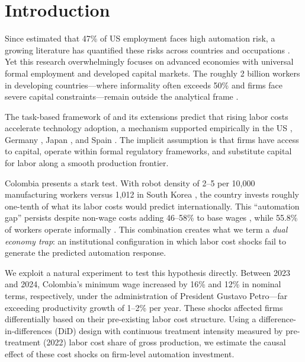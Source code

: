 \documentclass[5p,times,authoryear]{elsarticle}
\begin{document}

\section{Introduction}
\label{sec:introduction}

Since \citet{frey2017future} estimated that 47\% of US employment faces high automation risk, a growing literature has quantified these risks across countries and occupations \citep{arntz2016, webb2020, eloundou2023gpts}. Yet this research overwhelmingly focuses on advanced economies with universal formal employment and developed capital markets. The roughly 2 billion workers in developing countries---where informality often exceeds 50\% and firms face severe capital constraints---remain outside the analytical frame \citep{laporta2014, arias2023informality}.

The task-based framework of \citet{acemoglu2019automation} and its extensions \citep{acemoglu2020robots, acemoglu2022tasks} predict that rising labor costs accelerate technology adoption, a mechanism supported empirically in the US \citep{acemoglu2020robots}, Germany \citep{dauth2021}, Japan \citep{adachi2022}, and Spain \citep{koch2021}. The implicit assumption is that firms have access to capital, operate within formal regulatory frameworks, and substitute capital for labor along a smooth production frontier.

Colombia presents a stark test. With robot density of 2--5 per 10,000 manufacturing workers versus 1,012 in South Korea \citep{ifr2024}, the country invests roughly one-tenth of what its labor costs would predict internationally. This ``automation gap'' persists despite non-wage costs adding 46--58\% to base wages \citep{anif2018}, while 55.8\% of workers operate informally \citep{arias2023informality}. This combination creates what we term a \emph{dual economy trap}: an institutional configuration in which labor cost shocks fail to generate the predicted automation response.

We exploit a natural experiment to test this hypothesis directly. Between 2023 and 2024, Colombia's minimum wage increased by 16\% and 12\% in nominal terms, respectively, under the administration of President Gustavo Petro---far exceeding productivity growth of 1--2\% per year. These shocks affected firms differentially based on their pre-existing labor cost structure. Using a difference-in-differences (DiD) design with continuous treatment intensity measured by pre-treatment (2022) labor cost share of gross production, we estimate the causal effect of these cost shocks on firm-level automation investment.
\end{document}
